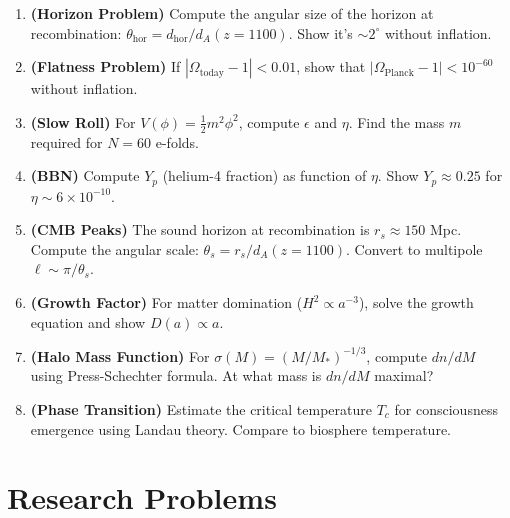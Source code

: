\begin{enumerate}
\item \textbf{(Horizon Problem)} Compute the angular size of the horizon at recombination: $\theta_{\text{hor}} = d_{\text{hor}} / d_A(z=1100)$. Show it's $\sim 2^\circ$ without inflation.

\item \textbf{(Flatness Problem)} If $|\Omega_{\text{today}} - 1| < 0.01$, show that $|\Omega_{\text{Planck}} - 1| < 10^{-60}$ without inflation.

\item \textbf{(Slow Roll)} For $V(\phi) = \frac{1}{2} m^2 \phi^2$, compute $\epsilon$ and $\eta$. Find the mass $m$ required for $N = 60$ e-folds.

\item \textbf{(BBN)} Compute $Y_p$ (helium-4 fraction) as function of $\eta$. Show $Y_p \approx 0.25$ for $\eta \sim 6 \times 10^{-10}$.

\item \textbf{(CMB Peaks)} The sound horizon at recombination is $r_s \approx 150$ Mpc. Compute the angular scale: $\theta_s = r_s / d_A(z=1100)$. Convert to multipole $\ell \sim \pi / \theta_s$.

\item \textbf{(Growth Factor)} For matter domination ($H^2 \propto a^{-3}$), solve the growth equation and show $D(a) \propto a$.

\item \textbf{(Halo Mass Function)} For $\sigma(M) = (M / M_*)^{-1/3}$, compute $dn/dM$ using Press-Schechter formula. At what mass is $dn/dM$ maximal?

\item \textbf{(Phase Transition)} Estimate the critical temperature $T_c$ for consciousness emergence using Landau theory. Compare to biosphere temperature.
\end{enumerate}

\section*{Research Problems}

